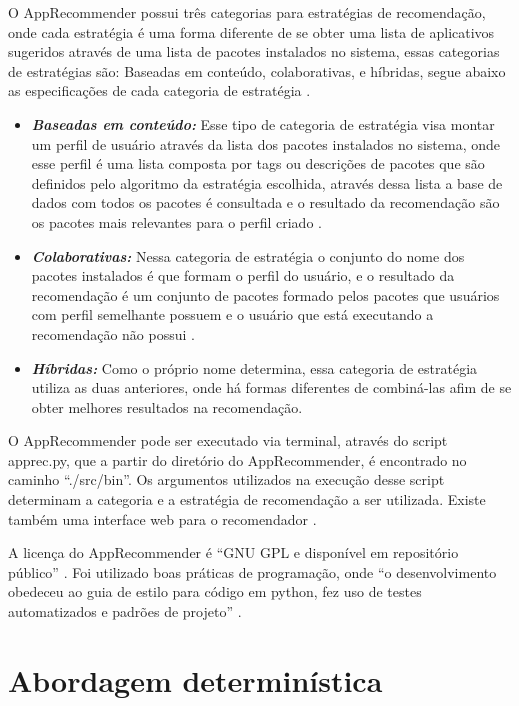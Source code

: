O AppRecommender possui três categorias para estratégias de recomendação, onde cada
estratégia é uma forma diferente de se obter uma lista de aplicativos sugeridos
através de uma lista de pacotes instalados no sistema, essas categorias de estratégias
são: Baseadas em conteúdo, colaborativas, e híbridas, segue abaixo as especificações
de cada categoria de estratégia \cite{araujo2011apprecommender}.

\begin{itemize}
    \item \textit{\textbf{Baseadas em conteúdo:}} Esse tipo de categoria de estratégia
visa montar um perfil de usuário através da lista dos pacotes instalados no sistema,
onde esse perfil é uma lista composta por tags ou descrições de pacotes que são
definidos pelo algoritmo da estratégia escolhida, através dessa lista a base de dados
com todos os pacotes é consultada e o resultado da recomendação são os pacotes mais
relevantes para o perfil criado \cite{araujo2011apprecommender}.
    \item \textit{\textbf{Colaborativas:}} Nessa categoria de estratégia o conjunto
do nome dos pacotes instalados é que formam o perfil do usuário, e o resultado da
recomendação é um conjunto de pacotes formado pelos pacotes que usuários com perfil
semelhante possuem e o usuário que está executando a recomendação não possui \cite{araujo2011apprecommender}.
    \item \textit{\textbf{Híbridas:}} Como o próprio nome determina, essa categoria
de estratégia utiliza as duas anteriores, onde há formas diferentes de combiná-las
afim de se obter melhores resultados na recomendação.
\end{itemize}

O AppRecommender pode ser executado via terminal, através do script apprec.py, que a
partir do diretório do AppRecommender, é encontrado no caminho “./src/bin”. Os
argumentos utilizados na execução desse script determinam a categoria e a estratégia
de recomendação a ser utilizada. Existe também uma interface web para o recomendador
\cite{araujo2011apprecommender}.

A licença do AppRecommender é “GNU GPL e disponível em repositório público” \cite{araujo2011apprecommender}.
Foi utilizado boas práticas de programação, onde “o desenvolvimento obedeceu ao guia
de estilo para código em python, fez uso de testes automatizados e padrões de
projeto” \cite{araujo2011apprecommender}.


\section{Abordagem determinística}

